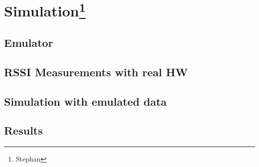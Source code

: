 \section[Simulation]{Simulation\footnote{Stephan}}

\subsection{Emulator}

\subsection{RSSI Measurements with real HW}

\subsection{Simulation with emulated data}

\subsection{Results}